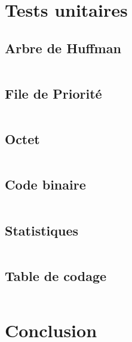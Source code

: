 \documentclass[12pt,a4paper]{article}
\begin{document}
\newpage

\section{Tests unitaires}
\subsection{Arbre de Huffman}
    \inputminted[breaklines]{c}{../code/src/tests/testArbre.c}
\subsection{File de Priorité}
    \inputminted[breaklines]{c}{../code/src/tests/testFile.c}
\subsection{Octet}
    \inputminted[breaklines]{c}{../code/src/tests/testOctet.c}
\subsection{Code binaire}
    \inputminted[breaklines]{c}{../code/src/tests/testCodeBinaire.c}
\subsection{Statistiques}
    \inputminted[breaklines]{c}{../code/src/tests/testStats.c}
\subsection{Table de codage}
    \inputminted[breaklines]{c}{../code/src/tests/testTable.c}

\newpage

\section{Conclusion}



\end{document}
